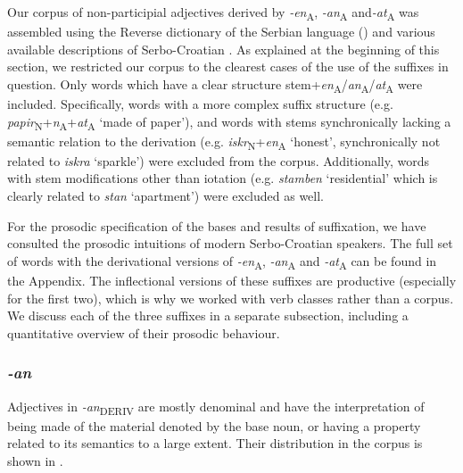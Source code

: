 \documentclass[output=paper]{langsci/langscibook}
\begin{document}
Our corpus of non-participial adjectives derived by  \textit{{-en}}\textsubscript{A}, \textit{{-an}}\textsubscript{A} and\textit{ {-at}}\textsubscript{A} was assembled using the Reverse dictionary of the Serbian language (\citealt{Nik2000}) and various available descriptions of Serbo-Croatian \citep{Bab2002, Ste1979, Bar1995}. 
As explained at the beginning of this section, we restricted our corpus to the clearest cases of the use of the suffixes in question. Only words which have a clear structure stem+\textit{en}\textsubscript{A}/\textit{an}\textsubscript{A}/\textit{at}\textsubscript{A} were included. Specifically, words with a more complex suffix structure (e.g. \textit{papir}\textsubscript{N}+\textit{n}\textsubscript{A}+\textit{at}\textsubscript{A} `made of paper'), and words with stems synchronically lacking a semantic relation to the derivation (e.g. \textit{iskr}\textsubscript{N}+\textit{en}\textsubscript{A} `honest', synchronically not related to \textit{iskra} `sparkle') were excluded from the corpus. Additionally, words with stem modifications other than iotation (e.g. \textit{stamben} `residential' which is clearly related to \textit{stan} `apartment') were excluded as well.

For the prosodic specification of the bases and results of suffixation, we have consulted the prosodic intuitions of modern Serbo-Croatian speakers. The full set of words with the derivational versions of \textit{-en}\textsubscript{A}, \textit{-an}\textsubscript{A} and \textit{-at}\textsubscript{A} can be found in the Appendix. The inflectional versions of these suffixes are productive (especially for the first two), which is why we worked with verb classes rather than a corpus. 
We discuss each of the three suffixes in a separate subsection, including a quantitative overview of their prosodic behaviour.

\subsubsection{\textit{-an}}\label{sec:simonovic:421}
Adjectives in \textit{-an}\textsubscript{DERIV} are mostly denominal and have the interpretation of being made of the material denoted by the base noun, or having a property related to its semantics to a large extent. Their distribution in the corpus is shown in .
\end{document}
